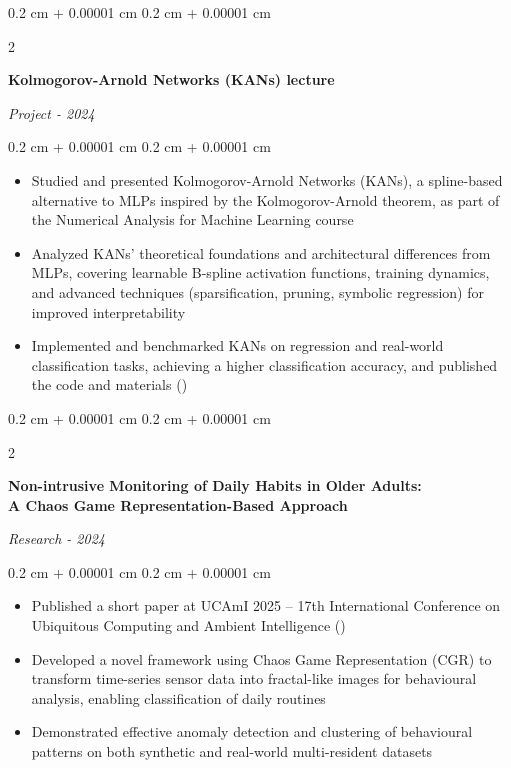 \documentclass[10pt, letterpaper]{article}
\newenvironment{highlights}{
    \begin{itemize}[
        topsep=0.10 cm,
        parsep=0.10 cm,
        partopsep=0pt,
        itemsep=0pt,
        leftmargin=0.4 cm + 10pt
    ]
}{
    \end{itemize}
} %
\newenvironment{onecolentry}{
    \begin{adjustwidth}{
        0.2 cm + 0.00001 cm
    }{
        0.2 cm + 0.00001 cm
    }
}{
    \end{adjustwidth}
} %
\newenvironment{twocolentry}[2][]{
    \onecolentry
    \def\secondColumn{#2}
    \setcolumnwidth{\fill, 4.5 cm}
    \begin{paracol}{2}
}{
    \switchcolumn \raggedleft \secondColumn
    \end{paracol}
    \endonecolentry
} %
\let\hrefWithoutArrow\href
\renewcommand{\href}[2]{\hrefWithoutArrow{#1}{\ifthenelse{\equal{#2}{}}{ }{#2 }\raisebox{.15ex}{\footnotesize \faExternalLink*}}}
\begin{document}
\vspace{0.20 cm}
\begin{twocolentry}{\textit{Project - 2024}}
    \textbf{Kolmogorov-Arnold Networks (KANs) lecture}
\end{twocolentry}
\vspace{0.10 cm}
\begin{onecolentry}
    \begin{highlights}
        \item Studied and presented Kolmogorov-Arnold Networks (KANs), a spline-based alternative to MLPs inspired by the Kolmogorov-Arnold theorem, as part of the Numerical Analysis for Machine Learning course
        \item Analyzed KANs' theoretical foundations and architectural differences from MLPs, covering learnable B-spline activation functions, training dynamics, and advanced techniques (sparsification, pruning, symbolic regression) for improved interpretability
        \item Implemented and benchmarked KANs on regression and real-world classification tasks, achieving a higher classification accuracy, and published the code and materials (\href{https://github.com/matteopasqual02/KAN-naml.git}{GitHub})
    \end{highlights}
\end{onecolentry}

\vspace{0.20 cm}
\begin{twocolentry}{\textit{Research - 2024}}
    \textbf{Non-intrusive Monitoring of Daily Habits in Older Adults: \\ A Chaos Game Representation-Based Approach}
\end{twocolentry}
\vspace{0.10 cm}
\begin{onecolentry}
    \begin{highlights}
        \item Published a short paper at UCAmI 2025 -- 17th International Conference on Ubiquitous Computing and Ambient Intelligence (\href{https://doi.org/10.1007/978-3-032-16992-1_20}{DOI})
        \item Developed a novel framework using Chaos Game Representation (CGR) to transform time-series sensor data into fractal-like images for behavioural analysis, enabling classification of daily routines
        \item Demonstrated effective anomaly detection and clustering of behavioural patterns on both synthetic and real-world multi-resident datasets
    \end{highlights}
\end{onecolentry}
\end{document}
